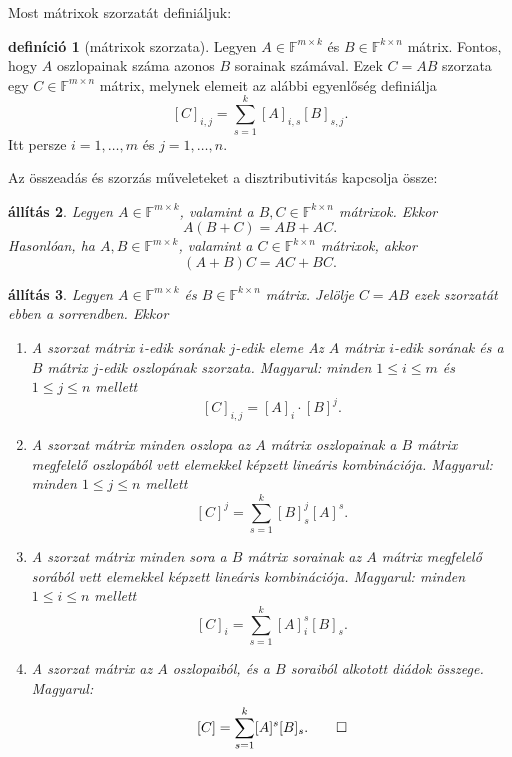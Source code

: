 \documentclass[9pt,showtrims]{memoir}
\theoremstyle{plain}
\newtheorem{proposition}{állítás}[chapter]
\theoremstyle{remark}
\theoremstyle{definition}
\newtheorem{definition}[proposition]{definíció}
\renewcommand{\mathbf}{\mathbb}
\begin{document}
Most mátrixok szorzatát definiáljuk:
\begin{definition}[mátrixok szorzata]
    Legyen $A\in\mathbf{F}^{m\times k}$ és $B\in\mathbf{F}^{k\times n}$ mátrix.
    Fontos, hogy $A$ oszlopainak száma azonos $B$ sorainak számával.
    Ezek $C=AB$ szorzata egy $C\in\mathbf{F}^{m\times n}$ mátrix,
    melynek elemeit az alábbi egyenlőség definiálja
    \[
        [C]_{i,j}=\sum_{s=1}^k[A]_{i,s}[B]_{s,j}.
    \]
    Itt persze $i=1,\dots,m$ és $j=1,\dots,n.$
\end{definition}
Az összeadás és szorzás műveleteket a disztributivitás kapcsolja össze:
\begin{proposition}
    Legyen $A\in\mathbf{F}^{m\times k}$, valamint a $B,C\in\mathbf{F}^{k\times n}$ mátrixok.
    Ekkor
    \begin{displaymath}
        A\left( B+C \right)=AB+AC.
    \end{displaymath}
    Hasonlóan,
    ha $A,B\in\mathbf{F}^{m\times k}$, valamint a $C\in\mathbf{F}^{k\times n}$ mátrixok,
    akkor
    \begin{displaymath}
        \left( A+B \right)C=AC+BC.
    \end{displaymath}
\end{proposition}
\begin{proposition}
    Legyen $A\in\mathbf{F}^{m\times k}$ és $B\in\mathbf{F}^{k\times n}$ mátrix.
    Jelölje $C=AB$ ezek szorzatát ebben a sorrendben.
    Ekkor
    \begin{enumerate}
        \item A szorzat mátrix $i$-edik sorának $j$-edik eleme Az $A$ mátrix $i$-edik sorának és a $B$ mátrix $j$-edik
            oszlopának szorzata. Magyarul: minden $1\leq i\leq m$ és $1\leq j \leq n$ mellett
            \[
                [C]_{i,j}=[A]_i\cdot [B]^j.
            \]
        \item
            A szorzat mátrix minden oszlopa az $A$ mátrix oszlopainak a $B$ mátrix megfelelő oszlopából vett elemekkel képzett
            lineáris kombinációja.
            Magyarul: minden $1\leq j\leq n$ mellett
            \[
                [C]^j=\sum_{s=1}^k[B]_s^j[A]^s.
            \]
        \item
            A szorzat mátrix minden sora a $B$ mátrix sorainak az $A$ mátrix megfelelő sorából vett elemekkel képzett
            lineáris kombinációja.
            Magyarul: minden $1\leq i\leq n$ mellett
            \[
                [C]_i=\sum_{s=1}^k[A]_i^s[B]_s.
            \]
        \item
            A szorzat mátrix az $A$ oszlopaiból, és a $B$ soraiból alkotott diádok összege.
            Magyarul:
            \[
                [C]=\sum_{s=1}^k[A]^s[B]_s.\qedhere
            \]
    \end{enumerate}
\end{proposition}
\end{document}
